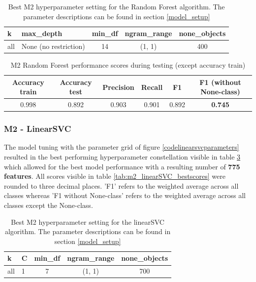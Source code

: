 \begin{table}[h!]
\begin{center}
\caption{Best M2 hyperparameter setting for the Random Forest algorithm. The parameter descriptions can be found in section \ref{model_setup}}\vspace{1ex}
\label{tab:m2_randomForest_bestParams}
\begin{tabular}{llccc}\hline
k & max\_depth & min\_df & ngram\_range & none\_objects \\ \hline
all & None (no restriction) & 14 & (1, 1) & 400 \\ \hline
\end{tabular}
\end{center}
\end{table}

\begin{table}[h!]
\begin{center}
\caption{M2 Random Forest performance scores during testing (except accuracy train)}\vspace{1ex}
\label{tab:m2_randomForest_bestscores}
\begin{tabular}{cccccc}\hline
Accuracy train & Accuracy test & Precision & Recall & F1 & F1 (without None-class)\\ \hline
0.998 & 0.892 & 0.903 & 0.901 & 0.892 & \textbf{0.745}\\ \hline
\end{tabular}
\end{center}
\end{table}

\subsubsection{M2 - LinearSVC}
The model tuning with the parameter grid of figure \ref{codelinearsvcparameters} resulted in the best performing hyperparameter constellation visible in table \ref{tab:m2_linearSVC_bestParams} which allowed for the best model performance with a resulting number of \textbf{775 features}. All scores visible in table \ref{tab:m2_linearSVC_bestscores} were rounded to three decimal places. 'F1' refers to the weighted average across all classes whereas 'F1 without None-class' refers to the weighted average across all classes except the None-class.

\begin{table}[h!]
\begin{center}
\caption{Best M2 hyperparameter setting for the linearSVC algorithm. The parameter descriptions can be found in section \ref{model_setup}}\vspace{1ex}
\label{tab:m2_linearSVC_bestParams}
\begin{tabular}{llccc}\hline
k & C & min\_df & ngram\_range & none\_objects \\ \hline
all & 1 & 7 & (1, 1) & 700 \\ \hline
\end{tabular}
\end{center}
\end{table}

